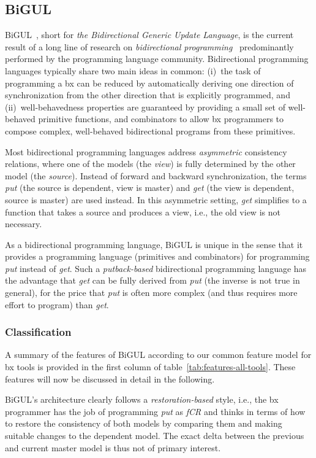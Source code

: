 \subsection{BiGUL}
\label{sec:BiGUL}

BiGUL~\cite{PEPM2016-Ko}, short for \emph{the Bidirectional Generic Update Language}, is the current result of a long line of research on \emph{bidirectional programming}~\cite{Foster2012} predominantly performed by the programming language community.
Bidirectional programming languages typically share two main ideas in common:  (i)~the task of programming a bx can be reduced by automatically deriving one direction of synchronization from the other direction that is explicitly programmed, and (ii)~well-behavedness properties are guaranteed by providing a small set of well-behaved primitive functions, and combinators to allow bx programmers to compose complex, well-behaved bidirectional programs from these primitives.

Most bidirectional programming languages address \emph{asymmetric} consistency relations, where one of the models (the \emph{view}) is fully determined by the other model (the \emph{source}).
Instead of forward and backward synchronization, the terms \emph{put} (the source is dependent, view is master) and \emph{get} (the view is dependent, source is master) are used instead.
In this asymmetric setting, \emph{get} simplifies to a function that takes a source and produces a view, i.e., the old view is not necessary. 

As a bidirectional programming language, BiGUL is unique in the sense that it provides a programming language (primitives and combinators) for programming \emph{put} instead of \emph{get}.
Such a \emph{putback-based} bidirectional programming language has the advantage that \emph{get} can be fully derived from \emph{put} (the inverse is not true in general), for the price that \emph{put} is often more complex (and thus requires more effort to program) than \emph{get}.


\subsubsection{Classification}
A summary of the features of BiGUL according to our common feature model for bx tools is provided in the first column of table~\ref{tab:features-all-tools}.
These features will now be discussed in detail in the following.

BiGUL's architecture clearly follows a \emph{restoration-based} style, i.e., the bx programmer has the job of programming \emph{put} as \emph{fCR} and thinks in terms of how to restore the consistency of both models by comparing them and making suitable changes to the dependent model.
The exact delta between the previous and current master model is thus not of primary interest.

